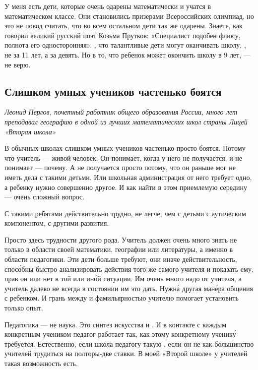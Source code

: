 У меня есть дети, которые очень одарены математически и учатся в математическом классе. Они становились призерами Всероссийских олимпиад, но это не повод считать, что во всем остальном дети так же одарены. Знаете, как говорил великий русский поэт Козьма Прутков: «Специалист подобен флюсу, полнота его односторонняя». , что талантливые дети могут оканчивать школу, , не за 11 лет, а за девять. Но в то, что ребенок может окончить школу в 9 лет, --- не верю.

\subsection{Слишком умных учеников частенько боятся}
\textit{Леонид Перлов, почетный работник общего образования России, много лет преподавал географию в одной из лучших математических школ страны Лицей «Вторая школа»}

В обычных школах слишком умных учеников частенько просто боятся. Потому что учитель --- живой человек. Он понимает, когда у него не получается, и не понимает --- почему. А не получается просто потому, что он раньше мог не иметь дела с такими детьми. Или школьная администрация от него требует одно, а ребенку нужно совершенно другое. И как найти в этом приемлемую середину --- очень сложный вопрос.

С такими ребятами действительно трудно,  не легче, чем с детьми с аутическим компонентом, с другими  развития.

Просто здесь трудности другого рода. Учитель должен очень много знать не только в области своей математики, географии или литературы, а именно в области педагогики. Эти дети больше требуют, они иначе  действительность, спос\'{о}бны быстро анализировать действия того же самого учителя и показать ему, прав он или нет в той или ин\'{о}й ситуации. Им очень много надо от учителя, а учитель далеко не всегда в состоянии им это дать. Нужн\'{а} другая ман\'{е}ра общения с ребенком. И грань между  и фамильярностью учителю помогает установить только опыт.

Педагогика --- не наука. Это синтез искусства и . И в контакте с каждым конкретным учеником педагог работает так, как этому конкретному ученик\'{у} требуется. Естественно, если школа  педагогу такую , если он не  как большинство учителей трудиться на полторы-две ставки. В моей «Второй школе» у учителей такая возможность есть.

